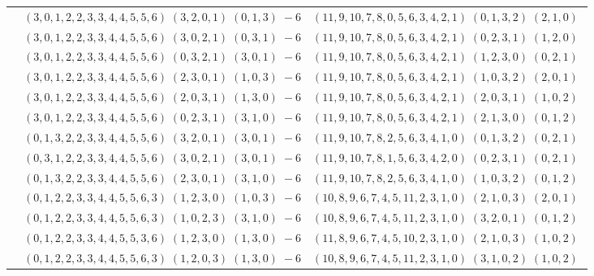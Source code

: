 \documentclass[11pt]{article}
\begin{document}
\begin{longtable}[l]{|c|c|c|}
 \cline{2-3} 
 & $(3 ,0 ,1 ,2 ,2 ,3 ,3 ,4 ,4 ,5 ,5 ,6) \;(3 ,2 ,0 ,1) \;(0 ,1 ,3) \;-6$ & $(11 ,9 ,10 ,7 ,8 ,0 ,5 ,6 ,3 ,4 ,2 ,1) \;(0 ,1 ,3 ,2) \;(2 ,1 ,0) \;$\\ 
 \cline{2-3} 
 & $(3 ,0 ,1 ,2 ,2 ,3 ,3 ,4 ,4 ,5 ,5 ,6) \;(3 ,0 ,2 ,1) \;(0 ,3 ,1) \;-6$ & $(11 ,9 ,10 ,7 ,8 ,0 ,5 ,6 ,3 ,4 ,2 ,1) \;(0 ,2 ,3 ,1) \;(1 ,2 ,0) \;$\\ 
 \cline{2-3} 
 & $(3 ,0 ,1 ,2 ,2 ,3 ,3 ,4 ,4 ,5 ,5 ,6) \;(0 ,3 ,2 ,1) \;(3 ,0 ,1) \;-6$ & $(11 ,9 ,10 ,7 ,8 ,0 ,5 ,6 ,3 ,4 ,2 ,1) \;(1 ,2 ,3 ,0) \;(0 ,2 ,1) \;$\\ 
 \cline{2-3} 
 & $(3 ,0 ,1 ,2 ,2 ,3 ,3 ,4 ,4 ,5 ,5 ,6) \;(2 ,3 ,0 ,1) \;(1 ,0 ,3) \;-6$ & $(11 ,9 ,10 ,7 ,8 ,0 ,5 ,6 ,3 ,4 ,2 ,1) \;(1 ,0 ,3 ,2) \;(2 ,0 ,1) \;$\\ 
 \cline{2-3} 
 & $(3 ,0 ,1 ,2 ,2 ,3 ,3 ,4 ,4 ,5 ,5 ,6) \;(2 ,0 ,3 ,1) \;(1 ,3 ,0) \;-6$ & $(11 ,9 ,10 ,7 ,8 ,0 ,5 ,6 ,3 ,4 ,2 ,1) \;(2 ,0 ,3 ,1) \;(1 ,0 ,2) \;$\\ 
 \cline{2-3} 
 & $(3 ,0 ,1 ,2 ,2 ,3 ,3 ,4 ,4 ,5 ,5 ,6) \;(0 ,2 ,3 ,1) \;(3 ,1 ,0) \;-6$ & $(11 ,9 ,10 ,7 ,8 ,0 ,5 ,6 ,3 ,4 ,2 ,1) \;(2 ,1 ,3 ,0) \;(0 ,1 ,2) \;$\\ 
 \cline{2-3} 
 & $(0 ,1 ,3 ,2 ,2 ,3 ,3 ,4 ,4 ,5 ,5 ,6) \;(3 ,2 ,0 ,1) \;(3 ,0 ,1) \;-6$ & $(11 ,9 ,10 ,7 ,8 ,2 ,5 ,6 ,3 ,4 ,1 ,0) \;(0 ,1 ,3 ,2) \;(0 ,2 ,1) \;$\\ 
 \cline{2-3} 
 & $(0 ,3 ,1 ,2 ,2 ,3 ,3 ,4 ,4 ,5 ,5 ,6) \;(3 ,0 ,2 ,1) \;(3 ,0 ,1) \;-6$ & $(11 ,9 ,10 ,7 ,8 ,1 ,5 ,6 ,3 ,4 ,2 ,0) \;(0 ,2 ,3 ,1) \;(0 ,2 ,1) \;$\\ 
 \cline{2-3} 
 & $(0 ,1 ,3 ,2 ,2 ,3 ,3 ,4 ,4 ,5 ,5 ,6) \;(2 ,3 ,0 ,1) \;(3 ,1 ,0) \;-6$ & $(11 ,9 ,10 ,7 ,8 ,2 ,5 ,6 ,3 ,4 ,1 ,0) \;(1 ,0 ,3 ,2) \;(0 ,1 ,2) \;$\\ 
 \cline{2-3} 
 & $(0 ,1 ,2 ,2 ,3 ,3 ,4 ,4 ,5 ,5 ,6 ,3) \;(1 ,2 ,3 ,0) \;(1 ,0 ,3) \;-6$ & $(10 ,8 ,9 ,6 ,7 ,4 ,5 ,11 ,2 ,3 ,1 ,0) \;(2 ,1 ,0 ,3) \;(2 ,0 ,1) \;$\\ 
 \cline{2-3} 
 & $(0 ,1 ,2 ,2 ,3 ,3 ,4 ,4 ,5 ,5 ,6 ,3) \;(1 ,0 ,2 ,3) \;(3 ,1 ,0) \;-6$ & $(10 ,8 ,9 ,6 ,7 ,4 ,5 ,11 ,2 ,3 ,1 ,0) \;(3 ,2 ,0 ,1) \;(0 ,1 ,2) \;$\\ 
 \cline{2-3} 
 & $(0 ,1 ,2 ,2 ,3 ,3 ,4 ,4 ,5 ,5 ,3 ,6) \;(1 ,2 ,3 ,0) \;(1 ,3 ,0) \;-6$ & $(11 ,8 ,9 ,6 ,7 ,4 ,5 ,10 ,2 ,3 ,1 ,0) \;(2 ,1 ,0 ,3) \;(1 ,0 ,2) \;$\\ 
 \cline{2-3} 
 & $(0 ,1 ,2 ,2 ,3 ,3 ,4 ,4 ,5 ,5 ,6 ,3) \;(1 ,2 ,0 ,3) \;(1 ,3 ,0) \;-6$ & $(10 ,8 ,9 ,6 ,7 ,4 ,5 ,11 ,2 ,3 ,1 ,0) \;(3 ,1 ,0 ,2) \;(1 ,0 ,2) \;$\\ 

\end{longtable}
\end{document}
